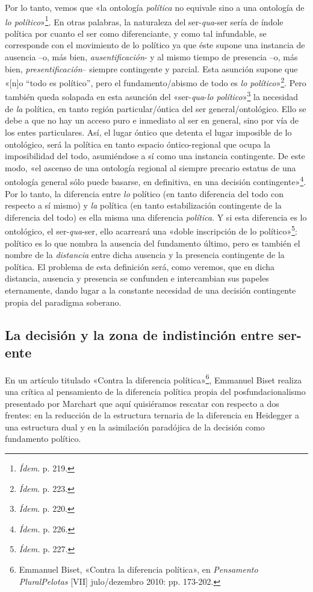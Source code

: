 Por lo tanto, vemos que «la ontología \emph{política} no equivale sino a una ontología de \emph{lo político}»\footnote{\emph{Ídem}. p. 219.}. En otras palabras, la naturaleza del ser-\emph{qua}-ser sería de índole política por cuanto el ser como diferenciante, y como tal infundable, se corresponde con el movimiento de lo político ya que éste supone una instancia de ausencia --o, más bien, \emph{ausentificación}- y al mismo tiempo de presencia --o, más bien, \emph{presentificación}-- siempre contingente y parcial. Esta asunción supone que «{[}n{]}o ``todo es político'', pero el fundamento/abismo de todo es \emph{lo político}»\footnote{\emph{Ídem}. p. 223.}. Pero también queda solapada en esta asunción del «ser-\emph{qua}-\emph{lo político}»\footnote{\emph{Ídem}. p. 220.} la necesidad de \emph{la} política, en tanto región particular/óntica del ser general/ontológico. Ello se debe a que no hay un acceso puro e inmediato al ser en general, sino por vía de los entes particulares. Así, el lugar óntico que detenta el lugar imposible de lo ontológico, será la política en tanto espacio óntico-regional que ocupa la imposibilidad del todo, asumiéndose a sí como una instancia contingente. De este modo, «el ascenso de una ontología regional al siempre precario estatus de una ontología general sólo puede basarse, en definitiva, en una decisión contingente»\footnote{\emph{Ídem.} p. 226.}. Por lo tanto, la diferencia entre \emph{lo} político (en tanto diferencia del todo con respecto a sí mismo) y \emph{la} política (en tanto estabilización contingente de la diferencia del todo) es ella misma una diferencia \emph{política}. Y si esta diferencia es lo ontológico, el ser-\emph{qua}-ser, ello acarreará una «doble inscripción de lo político»\footnote{\emph{Ídem.} p. 227.}: político es lo que nombra la ausencia del fundamento último, pero es también el nombre de la \emph{distancia} entre dicha ausencia y la presencia contingente de la política. El problema de esta definición será, como veremos, que en dicha distancia, ausencia y presencia se confunden e intercambian sus papeles eternamente, dando lugar a la constante necesidad de una decisión contingente propia del paradigma soberano.

\subsection{La decisión y la zona de indistinción entre ser-ente}

En un artículo titulado «Contra la diferencia política»\footnote{Emmanuel Biset, «Contra la diferencia política», en \emph{Pensamento Plural\textbar Pelotas} {[}VII{]} julo/dezembro 2010: pp. 173-202.}, Emmanuel Biset realiza una crítica al pensamiento de la diferencia política propia del posfundacionalismo presentado por Marchart que aquí quisiéramos rescatar con respecto a dos frentes: en la reducción de la estructura ternaria de la diferencia en Heidegger a una estructura dual y en la asimilación paradójica de la decisión como fundamento político.

